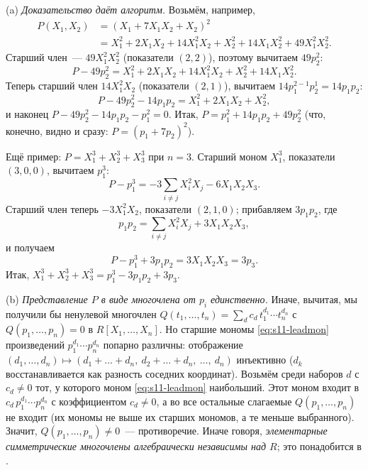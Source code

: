 \begin{remark}[5.37]
(a) \emph{Доказательство даёт алгоритм.} Возьмём, например,
\begin{align*}
P(X_1,X_2)&=(X_1+7X_1X_2+X_2)^2\\
&=X_1^2+2X_1X_2+14X_1^2X_2+X_2^2+14X_1X_2^2+49X_1^2X_2^2 .
\end{align*}
Старший член~--- $49X_1^2X_2^2$ (показатели $(2,2)$), поэтому вычитаем $49p_2^2$:
\[
P-49p_2^2=X_1^2+2X_1X_2+14X_1^2X_2+X_2^2+14X_1X_2^2 .
\]
Теперь старший член $14X_1^2X_2$ (показатели $(2,1)$), вычитаем $14p_1^{2-1}p_2^{1}=14p_1p_2$:
\[
P-49p_2^2-14p_1p_2=X_1^2+2X_1X_2+X_2^2,
\]
и наконец $P-49p_2^2-14p_1p_2-p_1^2=0$. Итак, $P=p_1^2+14p_1p_2+49p_2^2$ (что, конечно, видно и сразу:
$P=(p_1+7p_2)^2$).

Ещё пример: $P=X_1^3+X_2^3+X_3^3$ при $n=3$. Старший моном $X_1^3$, показатели $(3,0,0)$, вычитаем $p_1^3$:
\[
P-p_1^3=-3\sum_{i\ne j}X_i^2X_j-6X_1X_2X_3 .
\]
Старший член теперь $-3X_1^2X_2$, показатели $(2,1,0)$; прибавляем $3p_1p_2$, где
\[
p_1p_2=\sum_{i\ne j}X_i^2X_j+3X_1X_2X_3 ,
\]
и получаем
\[
P-p_1^3+3p_1p_2=3X_1X_2X_3=3p_3 .
\]
Итак, $X_1^3+X_2^3+X_3^3=p_1^3-3p_1p_2+3p_3$.

(b) \emph{Представление $P$ в виде многочлена от $p_i$ единственно.} Иначе, вычитая, мы получили бы ненулевой многочлен
$Q(t_1,\dots,t_n)=\sum_dc_d\,t_1^{d_1}\cdots t_n^{d_n}$ с $Q(p_1,\dots,p_n)=0$ в $R[X_1,\dots,X_n]$. Но старшие мономы
\eqref{eq:s11-leadmon} произведений $p_1^{d_1}\cdots p_n^{d_n}$ попарно различны: отображение
$(d_1,\dots,d_n)\mapsto(d_1+\dots+d_n,\ d_2+\dots+d_n,\ \dots,\ d_n)$ инъективно ($d_k$ восстанавливается как разность
соседних координат). Возьмём среди наборов $d$ с $c_d\ne0$ тот, у которого моном \eqref{eq:s11-leadmon} наибольший. Этот
моном входит в $c_d\,p_1^{d_1}\cdots p_n^{d_n}$ с коэффициентом $c_d\ne0$, а во все остальные слагаемые $Q(p_1,\dots,p_n)$
не входит (их мономы не выше их старших мономов, а те меньше выбранного). Значит, $Q(p_1,\dots,p_n)\ne0$~--- противоречие.
Иначе говоря, \emph{элементарные симметрические многочлены алгебраически независимы над $R$}; это понадобится в
.


\end{remark}
